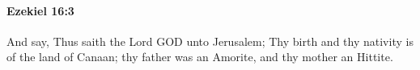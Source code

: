 
		\paragraph{Ezekiel 16:3} %
			\label{EZEKIEL-16-3}

			And say, Thus saith the Lord GOD unto Jerusalem; Thy birth and thy nativity is of the land of Canaan; thy father was an Amorite, and thy mother an Hittite.


